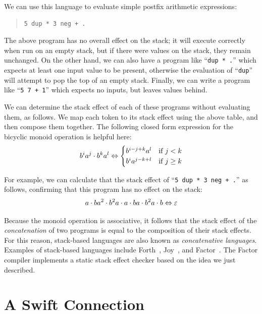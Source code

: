 \documentclass[../generics]{subfiles}
\begin{document}
\begin{example}
We can use this language to evaluate simple postfix arithmetic expressions:
\begin{quote}
\begin{verbatim}
5 dup * 3 neg + .
\end{verbatim}
\end{quote}
The above program has no overall effect on the stack; it will execute correctly when run on an empty stack, but if there were values on the stack, they remain unchanged. On the other hand, we can also have a program like ``\verb|dup * .|'' which expects at least one input value to be present, otherwise the evaluation of ``\texttt{dup}'' will attempt to pop the top of an empty stack. Finally, we can write a program like ``\verb|5 7 + 1|'' which expects no inputs, but leaves values behind.

We can determine the stack effect of each of these programs without evaluating them, as follows. We map each token to its stack effect using the above table, and then compose them together. The following closed form expression for the bicyclic monoid operation is helpful here:
\[
b^i a^j \cdot b^k a^l \Leftrightarrow \begin{cases}
b^{i-j+k} a^l &\text{if $j<k$}\\
b^i a^{j-k+l} &\text{if $j\geq k$}
\end{cases}
\]

For example, we can calculate that the stack effect of ``\verb|5 dup * 3 neg + .|'' as follows, confirming that this program has no effect on the stack:
\[a\cdot ba^2 \cdot b^2a \cdot a \cdot ba \cdot b^2a \cdot b \Leftrightarrow \varepsilon\]

Because the monoid operation is associative, it follows that the stack effect of the \emph{concatenation} of two programs is equal to the composition of their stack effects. For this reason, stack-based languages are also known as \emph{concatenative languages}. Examples of stack-based languages include Forth~\cite{forth}, Joy~\cite{joy}, and Factor~\cite{factor}. The Factor compiler implements a static stack effect checker based on the idea we just described.
\end{example}

\section{A Swift Connection}\label{monoidsasprotocols}
\end{document}
